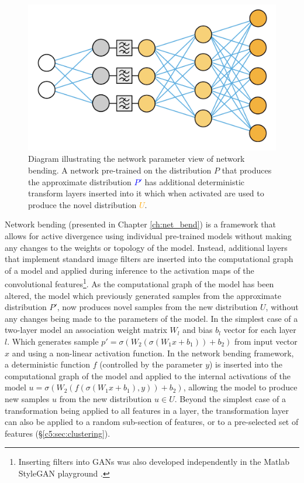 \begin{figure}[!htbp]
    \centering
    \includegraphics[width=1\textwidth]{figures/c6_active_div/diagrams/network_bending.png}
    \caption[Diagram illustrating the network parameter view of network bending.]{Diagram illustrating the network parameter view of network bending. A network pre-trained on the distribution $P$ that produces the approximate distribution \textcolor{blue}{$P'$} has additional deterministic transform layers inserted into it which when activated are used to produce the novel distribution \textcolor{orange}{$U$}.}
  \label{fig:c6:network-bending}
  \end{figure}

Network bending \citep{broad2021network,broad2022network} (presented in Chapter \ref{ch:net_bend}) is a framework that allows for active divergence using individual pre-trained models without making any changes to the weights or topology of the model. 
Instead, additional layers that implement standard image filters are inserted into the computational graph of a model and applied during inference to the activation maps of the convolutional features\footnote{
    Inserting filters into GANs was also developed independently in the Matlab StyleGAN playground \citep{pinkney2020matlab}.}. 
As the computational graph of the model has been altered, the model which previously generated samples from the approximate distribution $P'$, now produces novel samples from the new distribution $U$, without any changes being made to the parameters of the model. 
In the simplest case of a two-layer model an association weight matrix $W_l$ and bias $b_l$ vector for each layer $l$. 
Which generates sample $p'=\sigma(W_2(\sigma(W_1x+b_1))+b_2)$ from input vector $x$ and using a non-linear activation function. 
In the network bending framework, a deterministic function $f$ (controlled by the parameter $y$) is inserted into the computational graph of the model and applied to the internal activations of the model $u=\sigma(W_2(f(\sigma(W_1x+b_1),y))+b_2)$, allowing the model to produce new samples $u$ from the new distribution $u \in U$. Beyond the simplest case of a transformation being applied to all features in a layer, the transformation layer can also be applied to a random sub-section of features, or to a pre-selected set of features (\S \ref{c5:sec:clustering}). 

